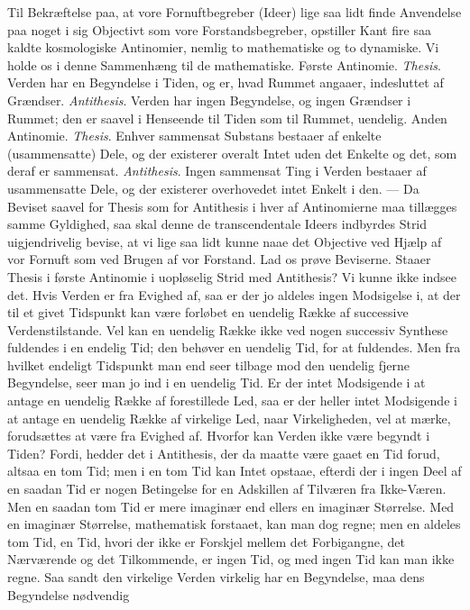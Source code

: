 \documentclass[12pt]{article}
\newcommand{\opage}[1]{\marginnote{\footnotesize\textit{[#1]}}}
\begin{document}
Til Bekræftelse paa, at vore Fornuftbegreber (Ideer) lige
saa lidt finde Anvendelse paa noget i sig Objectivt som vore
Forstandsbegreber, opstiller Kant fire saa kaldte kosmologiske
Antinomier, nemlig to mathematiske og to dynamiske. Vi
holde os i denne Sammenhæng til de mathematiske. Første
Antinomie. \emph{Thesis}. Verden har en Begyndelse i Tiden, og
er, hvad Rummet angaaer, indesluttet af Grændser. \emph{Antithesis}.
Verden har ingen Begyndelse, og ingen Grændser i Rummet;
den er saavel i Henseende til Tiden som til Rummet, uendelig.
Anden Antinomie. \emph{Thesis}. Enhver sammensat
Substans bestaaer af enkelte (usammensatte) Dele, og der
existerer overalt Intet uden det Enkelte og det, som deraf er
sammensat. \emph{Antithesis}. Ingen sammensat Ting i Verden
bestaaer af usammensatte Dele, og der existerer overhovedet
intet Enkelt i den. --- Da Beviset saavel for Thesis som for
Antithesis i hver af Antinomierne maa tillægges samme
Gyldighed, saa skal denne de transcendentale Ideers indbyrdes
Strid uigjendrivelig bevise, at vi lige saa lidt kunne naae det
Objective ved Hjælp af vor Fornuft som ved Brugen af vor
Forstand. Lad os prøve Beviserne. Staaer Thesis i første
Antinomie i uopløselig Strid med Antithesis? Vi kunne ikke indsee
det. Hvis Verden er fra Evighed af, saa er der jo aldeles
ingen Modsigelse i, at der til et givet Tidspunkt kan være forløbet
en uendelig Række af successive Verdenstilstande. Vel
kan en uendelig Række ikke ved nogen successiv Synthese
\opage{16} fuldendes i en endelig Tid; den behøver en uendelig Tid, for at
fuldendes. Men fra hvilket endeligt Tidspunkt man end seer
tilbage mod den uendelig fjerne Begyndelse, seer man jo
ind i en uendelig Tid. Er der intet Modsigende i at antage
en uendelig Række af forestillede Led, saa er der heller intet
Modsigende i at antage en uendelig Række af virkelige Led,
naar Virkeligheden, vel at mærke, forudsættes at være fra
Evighed af. Hvorfor kan Verden ikke være begyndt i Tiden? Fordi,
hedder det i Antithesis, der da maatte være gaaet en Tid forud,
altsaa en tom Tid; men i en tom Tid kan Intet opstaae, efterdi der i
ingen Deel af en saadan Tid er nogen Betingelse for en Adskillen
af Tilværen fra Ikke-Væren. Men en saadan tom Tid er mere
imaginær end ellers en imaginær Størrelse. Med en imaginær Stør\-relse,
mathematisk forstaaet, kan man dog regne; men en aldeles
tom Tid, en Tid, hvori der ikke er Forskjel mellem det Forbigangne,
det Nærværende og det Tilkommende, er ingen Tid, og med
ingen Tid kan man ikke regne. Saa sandt den virkelige Ver\-den
virkelig har en Begyndelse, maa dens Begyndelse nødvendig
\end{document}
